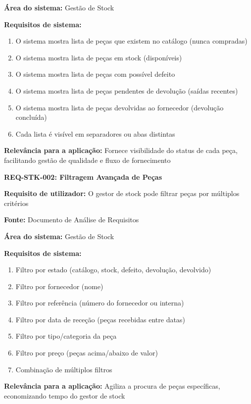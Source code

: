 \documentclass[11pt,a4paper]{article}
\newcommand{\reqheader}[1]{{\noindent\large\bfseries\color{sectionblue}#1}\par\vspace{0.3cm}}
\newcommand{\reqfield}[2]{{\noindent\textbf{#1:} #2}\par\vspace{0.2cm}}
\begin{document}
\reqfield{Área do sistema}{Gestão de Stock}

\reqfield{Requisitos de sistema}{
	\begin{enumerate}
		\item O sistema mostra lista de peças que existem no catálogo (nunca compradas)
		\item O sistema mostra lista de peças em stock (disponíveis)
		\item O sistema mostra lista de peças com possível defeito
		\item O sistema mostra lista de peças pendentes de devolução (saídas recentes)
		\item O sistema mostra lista de peças devolvidas ao fornecedor (devolução concluída)
		\item Cada lista é visível em separadores ou abas distintas
	\end{enumerate}
}

\reqfield{Relevância para a aplicação}{Fornece visibilidade do status de cada peça, facilitando gestão de qualidade e fluxo de fornecimento}

\vspace{0.8cm}

\reqheader{REQ-STK-002: Filtragem Avançada de Peças}

\reqfield{Requisito de utilizador}{O gestor de stock pode filtrar peças por múltiplos critérios}

\reqfield{Fonte}{Documento de Análise de Requisitos}

\reqfield{Área do sistema}{Gestão de Stock}

\reqfield{Requisitos de sistema}{
	\begin{enumerate}
		\item Filtro por estado (catálogo, stock, defeito, devolução, devolvido)
		\item Filtro por fornecedor (nome)
		\item Filtro por referência (número do fornecedor ou interna)
		\item Filtro por data de receção (peças recebidas entre datas)
		\item Filtro por tipo/categoria da peça
		\item Filtro por preço (peças acima/abaixo de valor)
		\item Combinação de múltiplos filtros
	\end{enumerate}
}

\reqfield{Relevância para a aplicação}{Agiliza a procura de peças específicas, economizando tempo do gestor de stock}
\end{document}
